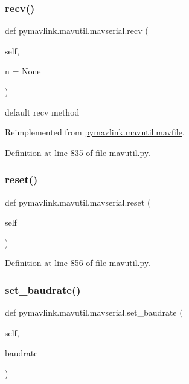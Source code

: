 \subsubsection{\texorpdfstring{recv()}{recv()}}
{\footnotesize\ttfamily def pymavlink.\+mavutil.\+mavserial.\+recv (\begin{DoxyParamCaption}\item[{}]{self,  }\item[{}]{n = {\ttfamily None} }\end{DoxyParamCaption})}

\begin{DoxyVerb}default recv method\end{DoxyVerb}
 

Reimplemented from \mbox{\hyperlink{classpymavlink_1_1mavutil_1_1mavfile_a09cb800fc6b03949ace05ce320539be2}{pymavlink.\+mavutil.\+mavfile}}.



Definition at line 835 of file mavutil.\+py.

\mbox{\label{classpymavlink_1_1mavutil_1_1mavserial_a0ab2dd40a877e6d0e4bf8f9232805fb9}} 
\subsubsection{\texorpdfstring{reset()}{reset()}}
{\footnotesize\ttfamily def pymavlink.\+mavutil.\+mavserial.\+reset (\begin{DoxyParamCaption}\item[{}]{self }\end{DoxyParamCaption})}



Definition at line 856 of file mavutil.\+py.

\mbox{\label{classpymavlink_1_1mavutil_1_1mavserial_aa69a31cb7e3cee07ec43174501cb79ac}} 
\subsubsection{\texorpdfstring{set\_baudrate()}{set\_baudrate()}}
{\footnotesize\ttfamily def pymavlink.\+mavutil.\+mavserial.\+set\+\_\+baudrate (\begin{DoxyParamCaption}\item[{}]{self,  }\item[{}]{baudrate }\end{DoxyParamCaption})}

